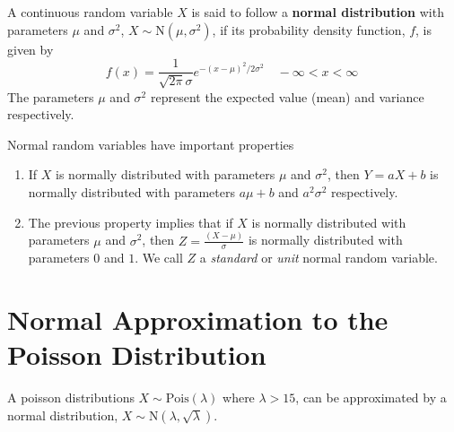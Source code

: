 \begin{defn}\label{mod2:defn:Normal}
	A continuous random variable $X$ is said to follow a \textbf{normal distribution} with parameters $\mu$ and $\sigma^2$, $X \sim \text{N}(\mu,\sigma^2)$, if its probability density function, $f$, is given by
	\begin{equation}
	f(x) = \frac{1}{\sqrt{2 \pi}\sigma} e^{-(x-\mu)^2/2\sigma^2} \quad -\infty < x < \infty  \label{mod2:eq:Normal}\
	\end{equation}
	The parameters $\mu$ and $\sigma^2$ represent the expected value (mean) and variance respectively.
\end{defn}

\begin{note} \label{mod2:note:Normal:Properties}
	Normal random variables have important properties
	\begin{enumerate}[label = (\roman*)]
		\item If $X$ is normally distributed with parameters $\mu$ and $\sigma^2$, then $Y = aX + b$ is normally distributed with parameters $a\mu + b$ and $a^2\sigma^2$ respectively. \label{mod2:note:Normal:Property1}
		\item The previous property implies that if $X$ is normally distributed with parameters $\mu$ and $\sigma^2$, then $Z=\frac{(X-\mu)}{\sigma}$ is normally distributed with parameters $0$ and $1$. We call $Z$ a \textit{standard} or \textit{unit} normal random variable. \label{mod2:note:Normal:Property2}
	\end{enumerate}
\end{note}


\section{Normal Approximation to the Poisson Distribution} \label{mod2:section:NormalApproxPois}

\begin{defn}\label{mod2:def:NormalApproxToPois:Definition}
	A poisson distributions $X \sim \text{Pois}(\lambda)$ where $\lambda > 15$, can be approximated by a normal distribution, $X \sim \text{N}(\lambda, \sqrt{\lambda})$.
\end{defn}

